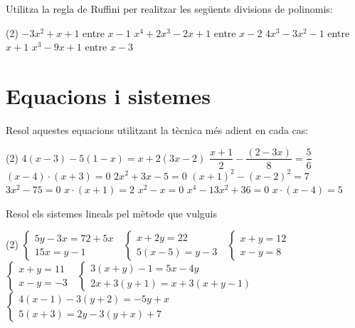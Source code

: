 \documentclass{article}
\let\frac\dfrac
\begin{document}
\begin{mylist}
  	
  	\item  Utilitza la regla de {Ruffini} per realitzar les següents divisions de polinomis:
  	\begin{tasks}(2)
  		\task $-3x^{2} +x+1$ entre $x-1$  
  		\task $x^{4} +2x^{3} -2x+1$ entre $x-2$
  		\task $4x^{3} -3x^{2} -1$ entre $x+1$   
  		\task $x^{3} -9x+1$ entre $x-3$ 
  	\end{tasks}
 
  \end{mylist}
  
   
  
  \section{Equacions i sistemes }
  \begin{mylist}
  	
  	
  	\item Resol aquestes equacions utilitzant la tècnica més adient en cada cas: 
  	\begin{tasks}(2)
  		\task $4(x-3) - 5 (1-x) = x + 2 (3x-2)$
  		\task $\frac{x+1}{2} -\frac{(2-3x)}{8} = \frac{5}{6}$
  		\task $(x-4)\cdot (x+3)=0$
  		\task $2x^2+3x-5=0$
  		\task  $(x+1)^2 - (x-2)^2=7$
  	 	\task  $3x^{2} -75=0$
  		\task  $x\cdot (x+1)=2$   
  	  	\task  $x^{2} -x=0$
  		\task  $x^{4} -13x^{2} +36=0$  
  		\task $x \cdot (x-4)=5$
  	\end{tasks}
  	
  	
 
  	
  	\item   Resol els sistemes lineals pel mètode que vulguis
  	\begin{tasks}(2)
  		\task $\left\{\begin{array}{l} {5y-3x=72+5x} \\ {15x=y-1} \end{array}\right. \; $    
  		\task  $\left\{\begin{array}{l} {x+2y=22} \\ {5(x-5)=y-3} \end{array}\right. \; $  
  		\task  $\left\{\begin{array}{l} {x+y=12} \\ {x-y=8} \end{array}\right. \; $      
  		\task  $\left\{\begin{array}{l} {x+y=11} \\ {x-y=-3} \end{array}\right. \; $  
  		\task $\left\{\begin{array}{l} {3(x+y)-1=5x-4y} \\ {2x+3(y+1)=x+3(x+y-1)} \end{array}\right. \; $  
  		\task  $\left\{\begin{array}{l} {4(x-1)-3(y+2)=-5y+x} \\ {5(x+3)=2y-3(y+x)+7} \end{array}\right. \; $
  	\end{tasks}
  	
   
  \end{mylist}
  
\end{document}
